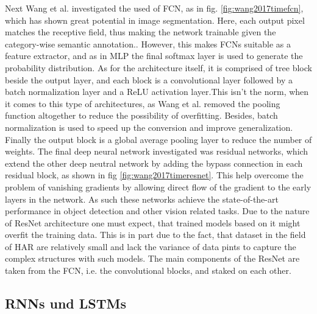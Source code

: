 Next Wang et al. investigated the used of FCN, as in fig. \ref{fig:wang2017timefcn}, which has shown great potential in image segmentation. Here, each output pixel matches the receptive field, thus making the network trainable given the category-wise semantic annotation.\cite{wang2017time}. However, this makes FCNs suitable as a feature extractor, and as in MLP the final softmax layer is used to generate the probability distribution. As for the architecture itself, it is comprised of tree block beside the output layer, and each block is a convolutional layer followed by a batch normalization layer and a ReLU activation layer.This isn't the norm, when it comes to this type of architectures, as Wang et al. removed the pooling function altogether to reduce the possibility of overfitting. Besides, batch normalization is used to speed up the conversion and improve generalization. Finally the output block is a global average pooling layer to reduce the number of weights\cite{wang2017time}.\newline
The final deep neural network investigated was residual networks, which extend the other deep neutral network by adding the bypass connection in each residual block, as shown in fig \ref{fig:wang2017timeresnet}. This help overcome the problem of vanishing gradients by allowing direct flow of the gradient to the early layers in the network. As such these networks achieve the state-of-the-art performance in object detection and other vision related tasks. Due to the nature of ResNet architecture one must expect, that trained models based on it might overfit the training data. This is in part due to the fact, that dataset in the field of HAR are relatively small and lack the variance of data pints to capture the complex structures with such models. The main components of the ResNet are taken from the FCN, i.e. the convolutional blocks, and staked on each other.
\subsection{RNNs und LSTMs}
